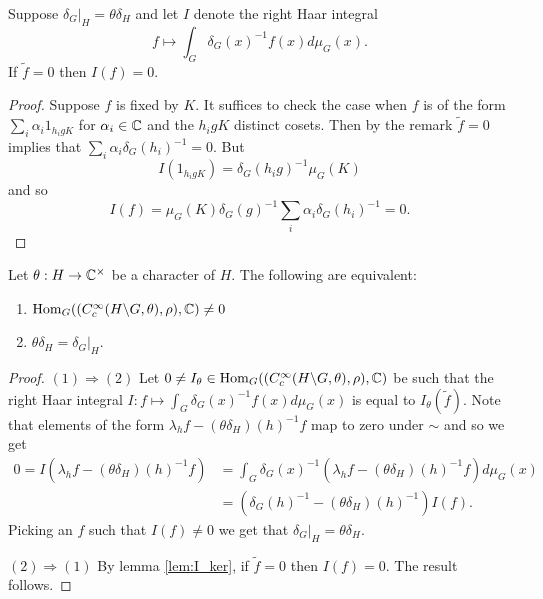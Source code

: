 \documentclass{memoir}
\begin{document}
\begin{lemma}
    \label{lem:I_ker}
    Suppose $\delta_G|_H = \theta \delta_H$ and let $I$ denote the right Haar integral 
    \begin{equation}
        f\mapsto \int_G\delta_G(x)^{-1}f(x)d\mu_G(x).
    \end{equation}
    If $\tilde f = 0$ then $I(f) = 0$.
\end{lemma}
\begin{proof}
    Suppose $f$ is fixed by $K$.
    It suffices to check the case when $f$ is of the form $\sum_i\alpha_i1_{h_igK}$ for $\alpha_i\in \mathbb{C}$ and the $h_igK$ distinct cosets.
    Then by the remark $\tilde f = 0$ implies that $\sum_i\alpha_i\delta_G(h_i)^{-1} = 0$.
    But 
    \begin{equation}
        I(1_{h_igK}) = \delta_G(h_ig)^{-1}\mu_G(K)
    \end{equation}
    and so 
    \begin{equation}
        I(f) = \mu_G(K)\delta_G(g)^{-1}\sum_i\alpha_i\delta_G(h_i)^{-1} = 0.
    \end{equation}
\end{proof}
\begin{thm}
    Let $\theta:H\to \mathbb{C}^\times$ be a character of $H$.
    The following are equivalent:
    \begin{enumerate}
        \item $\operatorname{Hom}_G((C_c^\infty(H\backslash G,\theta),\rho),\mathbb{C}) \ne 0$
        \item $\theta\delta_H = \delta_G|_H$.
    \end{enumerate}
\end{thm}
\begin{proof}
    $(1)\Rightarrow (2)$ Let $0\ne I_\theta\in \operatorname{Hom}_G((C_c^\infty(H\backslash G,\theta),\rho),\mathbb{C})$ be such that the right Haar integral $I:f\mapsto \int_G\delta_G(x)^{-1}f(x)d\mu_G(x)$ is equal to $I_\theta(\tilde f)$.
    Note that elements of the form $\lambda_hf-(\theta\delta_H)(h)^{-1}f$ map to zero under $\sim$ and so we get
    \begin{align}
        0 = I(\lambda_hf-(\theta\delta_H)(h)^{-1}f) &= \int_G\delta_G(x)^{-1}(\lambda_hf-(\theta\delta_H)(h)^{-1}f)d\mu_G(x) \nonumber \\
                                                    &= \left(\delta_G(h)^{-1}-(\theta\delta_H)(h)^{-1}\right)I(f).
    \end{align}
    Picking an $f$ such that $I(f)\ne 0$ we get that $\delta_G|_H = \theta\delta_H$.

    $(2)\Rightarrow(1)$ By lemma \ref{lem:I_ker}, if $\tilde f = 0$ then $I(f) = 0$.
    The result follows.
\end{proof}
\end{document}
